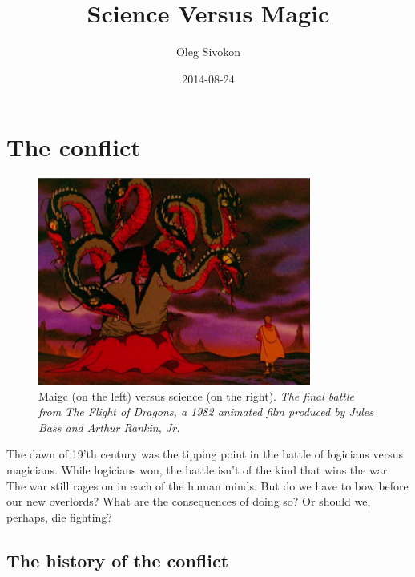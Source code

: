 \documentclass[11pt]{article}
\author{Oleg Sivokon}
\date{2014-08-24}
\title{Science Versus Magic}
\begin{document}
\maketitle
\tableofcontents


\newpage

\section{The conflict}
\label{sec-1}

\begin{figure}[h!]
  \centering
  \includegraphics[width=0.8\textwidth]{./the-flight-of-dragons.png}
  \caption[Magic vs Science]{
    \ssmall Maigc (on the left) versus science (on the right).
    \textit{The final battle from The Flight of Dragons,
      a 1982 animated film produced by Jules Bass and Arthur Rankin, Jr.}}
\end{figure}

The dawn of 19'th century was the tipping point in the battle of logicians
versus magicians.  While logicians won, the battle isn't of the kind that wins
the war.  The war still rages on in each of the human minds.  But do we have
to bow before our new overlords?  What are the consequences of doing so?
Or should we, perhaps, die fighting?

\subsection{The history of the conflict}
\label{sec-1-1}
\end{document}
